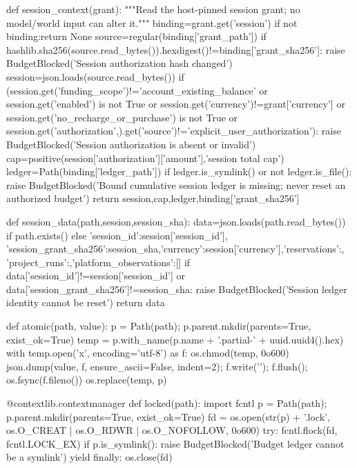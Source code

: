 def session_context(grant):
    """Read the host-pinned session grant; no model/world input can alter it."""
    binding=grant.get('session')
    if not binding:return None
    source=regular(binding['grant_path'])
    if hashlib.sha256(source.read_bytes()).hexdigest()!=binding['grant_sha256']:
        raise BudgetBlocked('Session authorization hash changed')
    session=json.loads(source.read_bytes())
    if (session.get('funding_scope')!='account_existing_balance' or session.get('enabled') is not True
            or session.get('currency')!=grant['currency'] or session.get('no_recharge_or_purchase') is not True
            or session.get('authorization',{}).get('source')!='explicit_user_authorization'):
        raise BudgetBlocked('Session authorization is absent or invalid')
    cap=positive(session['authorization']['amount'],'session total cap')
    ledger=Path(binding['ledger_path'])
    if ledger.is_symlink() or not ledger.is_file():
        raise BudgetBlocked('Bound cumulative session ledger is missing; never reset an authorized budget')
    return session,cap,ledger,binding['grant_sha256']

def session_data(path,session,session_sha):
    data=json.loads(path.read_bytes()) if path.exists() else {'session_id':session['session_id'],
        'session_grant_sha256':session_sha,'currency':session['currency'],'reservations':{},
        'project_runs':{},'platform_observations':[]}
    if data['session_id']!=session['session_id'] or data['session_grant_sha256']!=session_sha:
        raise BudgetBlocked('Session ledger identity cannot be reset')
    return data

def atomic(path, value):
    p = Path(path); p.parent.mkdir(parents=True, exist_ok=True)
    temp = p.with_name(p.name + '.partial-' + uuid.uuid4().hex)
    with temp.open('x', encoding='utf-8') as f:
        os.chmod(temp, 0o600)
        json.dump(value, f, ensure_ascii=False, indent=2); f.write('\n'); f.flush(); os.fsync(f.fileno())
    os.replace(temp, p)

@contextlib.contextmanager
def locked(path):
    import fcntl
    p = Path(path); p.parent.mkdir(parents=True, exist_ok=True)
    fd = os.open(str(p) + '.lock', os.O_CREAT | os.O_RDWR | os.O_NOFOLLOW, 0o600)
    try:
        fcntl.flock(fd, fcntl.LOCK_EX)
        if p.is_symlink(): raise BudgetBlocked('Budget ledger cannot be a symlink')
        yield
    finally: os.close(fd)


